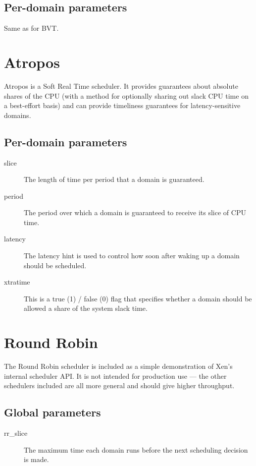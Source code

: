 \documentclass[11pt,twoside,final,openright]{xenstyle}
\begin{document}
{\subsection{Per-domain parameters}

Same as for BVT.

\section{Atropos}

Atropos is a Soft Real Time scheduler.  It provides guarantees about
absolute shares of the CPU (with a method for optionally sharing out
slack CPU time on a best-effort basis) and can provide timeliness
guarantees for latency-sensitive domains.

\subsection{Per-domain parameters}

\begin{description}
\item[slice]
  The length of time per period that a domain is guaranteed.
\item[period]
  The period over which a domain is guaranteed to receive
  its slice of CPU time.
\item[latency]
  The latency hint is used to control how soon after
  waking up a domain should be scheduled.
\item[xtratime]
  This is a true (1) / false (0) flag that specifies whether
  a domain should be allowed a share of the system slack time.
\end{description}

\section{Round Robin}

The Round Robin scheduler is included as a simple demonstration of
Xen's internal scheduler API.  It is not intended for production use
--- the other schedulers included are all more general and should give
higher throughput.

\subsection{Global parameters}

\begin{description}
\item[rr\_slice]
  The maximum time each domain runs before the next
  scheduling decision is made.
\end{description}

}
\end{document}
